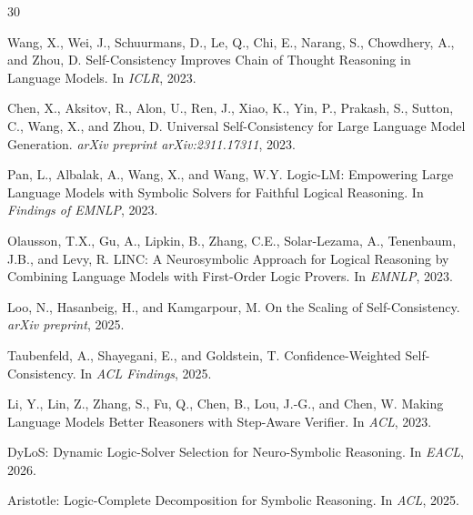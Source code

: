 \documentclass[11pt,a4paper]{article}
\begin{document}


\begin{thebibliography}{30}

Wang, X., Wei, J., Schuurmans, D., Le, Q., Chi, E., Narang, S., Chowdhery, A., and Zhou, D.
\newblock Self-Consistency Improves Chain of Thought Reasoning in Language Models.
\newblock In \emph{ICLR}, 2023.

Chen, X., Aksitov, R., Alon, U., Ren, J., Xiao, K., Yin, P., Prakash, S., Sutton, C., Wang, X., and Zhou, D.
\newblock Universal Self-Consistency for Large Language Model Generation.
\newblock \emph{arXiv preprint arXiv:2311.17311}, 2023.

Pan, L., Albalak, A., Wang, X., and Wang, W.Y.
\newblock Logic-LM: Empowering Large Language Models with Symbolic Solvers for Faithful Logical Reasoning.
\newblock In \emph{Findings of EMNLP}, 2023.

Olausson, T.X., Gu, A., Lipkin, B., Zhang, C.E., Solar-Lezama, A., Tenenbaum, J.B., and Levy, R.
\newblock LINC: A Neurosymbolic Approach for Logical Reasoning by Combining Language Models with First-Order Logic Provers.
\newblock In \emph{EMNLP}, 2023.

Loo, N., Hasanbeig, H., and Kamgarpour, M.
\newblock On the Scaling of Self-Consistency.
\newblock \emph{arXiv preprint}, 2025.

Taubenfeld, A., Shayegani, E., and Goldstein, T.
\newblock Confidence-Weighted Self-Consistency.
\newblock In \emph{ACL Findings}, 2025.

Li, Y., Lin, Z., Zhang, S., Fu, Q., Chen, B., Lou, J.-G., and Chen, W.
\newblock Making Language Models Better Reasoners with Step-Aware Verifier.
\newblock In \emph{ACL}, 2023.

DyLoS: Dynamic Logic-Solver Selection for Neuro-Symbolic Reasoning.
\newblock In \emph{EACL}, 2026.

Aristotle: Logic-Complete Decomposition for Symbolic Reasoning.
\newblock In \emph{ACL}, 2025.


\end{thebibliography}
\end{document}
